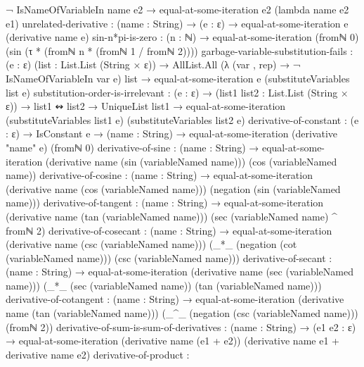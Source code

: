 \documentclass{report}
\begin{document}
\begin{code}
      ¬ IsNameOfVariableIn name e2 →
      equal-at-some-iteration e2 (lambda name e2 e1)
    unrelated-derivative :
      (name : String) →
      (e : ε) →
      equal-at-some-iteration e (derivative name e)
    sin-n*pi-is-zero :
      (n : ℕ) →
      equal-at-some-iteration (fromℕ 0)
                              (sin (τ * (fromℕ n * (fromℕ 1 / fromℕ 2))))
    garbage-variable-substitution-fails :
      (e : ε)
      (list : List.List (String × ε)) →
      AllList.All (λ (var , rep) → ¬ IsNameOfVariableIn var e)
                  list →
      equal-at-some-iteration e (substituteVariables list e)
    substitution-order-is-irrelevant :
      (e : ε) →
      (list1 list2 : List.List (String × ε)) →
      list1 ↭ list2 →
      UniqueList list1 →
      equal-at-some-iteration (substituteVariables list1 e)
                              (substituteVariables list2 e)
    derivative-of-constant :
      (e : ε) →
      IsConstant e →
      (name : String) →
      equal-at-some-iteration (derivative "name" e) (fromℕ 0)
    derivative-of-sine :
      (name : String) →
      equal-at-some-iteration (derivative name (sin (variableNamed name)))
                              (cos (variableNamed name))
    derivative-of-cosine :
      (name : String) →
      equal-at-some-iteration (derivative name (cos (variableNamed name)))
                              (negation (sin (variableNamed name)))
    derivative-of-tangent :
      (name : String) →
      equal-at-some-iteration (derivative name (tan (variableNamed name)))
                              (sec (variableNamed name) ^ fromℕ 2)
    derivative-of-cosecant :
      (name : String) →
      equal-at-some-iteration (derivative name (csc (variableNamed name)))
                              (_*_ (negation (cot (variableNamed name)))
                                   (csc (variableNamed name)))
    derivative-of-secant :
      (name : String) →
      equal-at-some-iteration (derivative name (sec (variableNamed name)))
                              (_*_ (sec (variableNamed name))
                                   (tan (variableNamed name)))
    derivative-of-cotangent :
      (name : String) →
      equal-at-some-iteration (derivative name (tan (variableNamed name)))
                              (_^_ (negation (csc (variableNamed name)))
                                   (fromℕ 2))
    derivative-of-sum-is-sum-of-derivatives :
      (name : String) →
      (e1 e2 : ε) →
      equal-at-some-iteration (derivative name (e1 + e2))
                              (derivative name e1 + derivative name e2)
    derivative-of-product :

\end{code}
\end{document}
